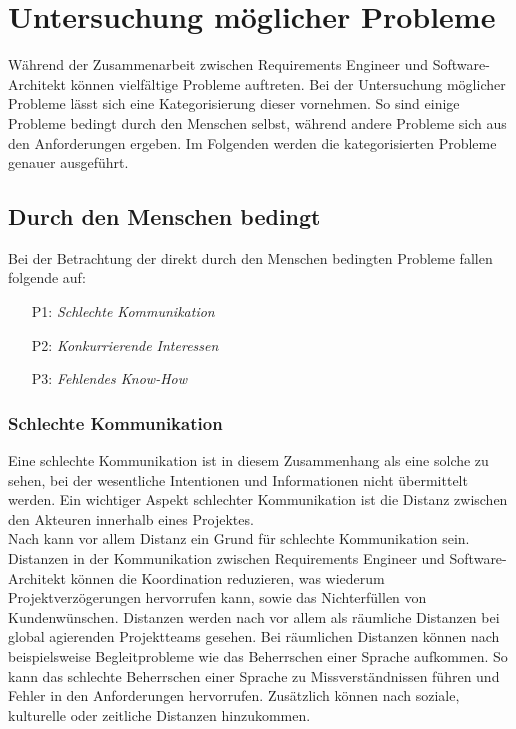\section{Untersuchung m\"oglicher Probleme}\label{problem}
W\"ahrend der Zusammenarbeit zwischen Requirements Engineer und Software-Architekt k\"onnen vielf\"altige Probleme auftreten. Bei der Untersuchung m\"oglicher Probleme l\"asst sich eine Kategorisierung dieser vornehmen. So sind einige Probleme bedingt durch den Menschen selbst, w\"ahrend andere Probleme sich aus den Anforderungen ergeben. Im Folgenden werden die kategorisierten Probleme genauer ausgef\"uhrt. \\

\subsection{Durch den Menschen bedingt}
Bei der Betrachtung der direkt durch den Menschen bedingten Probleme fallen folgende auf:\\

\begin{itemize}
\item[P1:] \textit{Schlechte Kommunikation} 
\item[P2:] \textit{Konkurrierende Interessen}
\item[P3:] \textit{Fehlendes Know-How} \\
\end{itemize}

\subsubsection{Schlechte Kommunikation}
Eine schlechte Kommunikation ist in diesem Zusammenhang als eine solche zu sehen, bei der wesentliche Intentionen und Informationen nicht \"ubermittelt werden. Ein wichtiger Aspekt schlechter Kommunikation ist die Distanz zwischen den Akteuren innerhalb eines Projektes.\\

Nach \cite{Bja01} kann vor allem Distanz ein Grund f\"ur schlechte Kommunikation sein. Distanzen in der Kommunikation zwischen Requirements Engineer und Software-Architekt k\"onnen die Koordination reduzieren, was wiederum Projektverz\"ogerungen hervorrufen kann, sowie das Nichterf\"ullen von Kundenw\"unschen. Distanzen werden nach \cite{Bja01} vor allem als r\"aumliche Distanzen bei global agierenden Projektteams gesehen. Bei r\"aumlichen Distanzen k\"onnen nach \cite{Her01} beispielsweise Begleitprobleme wie das Beherrschen einer Sprache aufkommen. So kann das schlechte Beherrschen einer Sprache zu Missverst\"andnissen f\"uhren und Fehler in den Anforderungen hervorrufen.  Zus\"atzlich k\"onnen nach \cite{Bja01} soziale, kulturelle oder zeitliche Distanzen hinzukommen.\\

